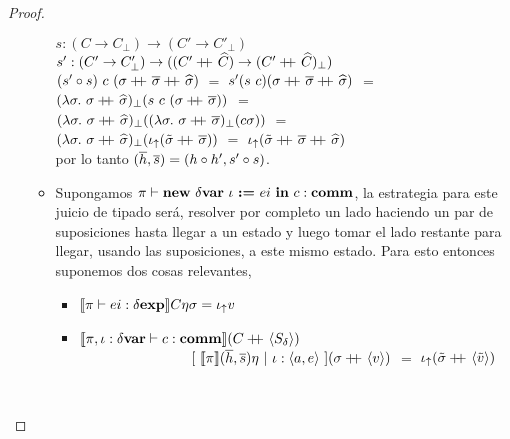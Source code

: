 \begin{proof}
\begin{itemize}
\begin{itemize}
$s : (C \rightarrow C_\bot) \rightarrow (C' \rightarrow C'_\bot)$\\
$s' : (C' \rightarrow C'_\bot) \rightarrow 
   	  ((C' +\kern-1.3ex+\kern0.8ex \widehat{C}) \rightarrow (C' +\kern-1.3ex+\kern0.8ex \widehat{C})_\bot)$\\
$(s' \circ s) \ c \ (\sigma +\kern-1.3ex+\kern0.8ex \overline{\sigma} +\kern-1.3ex+\kern0.8ex \widehat{\sigma})$ $=$
$s' (s \ c) (\sigma +\kern-1.3ex+\kern0.8ex \overline{\sigma} +\kern-1.3ex+\kern0.8ex \widehat{\sigma})$ $=$\\
$(\lambda \sigma. \ \sigma +\kern-1.3ex+\kern0.8ex \widehat{\sigma})_{\bot}
	(s \ c \ (\sigma +\kern-1.3ex+\kern0.8ex \overline{\sigma}))$ $=$\\
$(\lambda \sigma . \ \sigma +\kern-1.3ex+\kern0.8ex \widehat{\sigma})_{\bot}
((\lambda \sigma . \ \sigma +\kern-1.3ex+\kern0.8ex \overline{\sigma})_{\bot}(c \sigma))$ $=$\\
$(\lambda \sigma . \ \sigma +\kern-1.3ex+\kern0.8ex \widehat{\sigma})_{\bot}
(\iota_{\uparrow} (\tilde{\sigma} +\kern-1.3ex+\kern0.8ex \overline{\sigma}))$ $=$ 
$\iota_{\uparrow} (\tilde{\sigma} +\kern-1.3ex+\kern0.8ex \overline{\sigma} +\kern-1.3ex+\kern0.8ex \widehat{\sigma})$\\

por lo tanto $(\overline{h},\overline{s}) = (h \circ h',s'\circ s)$.\\

\item Supongamos $\pi \vdash \textbf{new} \ \delta \textbf{var} \ \iota \ \textbf{:=} \ ei \ \textbf{in} \ c : \textbf{comm}$, la estrategia para
este juicio de tipado ser\'a, resolver por completo un lado haciendo un par de suposiciones
hasta llegar a un estado y luego tomar el lado restante para llegar, usando las suposiciones,
a este mismo estado. Para esto entonces suponemos dos cosas relevantes,

\begin{itemize}
\item $\llbracket \pi \vdash ei : \delta \textbf{exp} \rrbracket C\eta\sigma = \iota_{\uparrow} v$
\item $\llbracket \pi,\iota:\delta \textbf{var} \vdash c : \textbf{comm} \rrbracket(C +\kern-1.3ex+\kern0.8ex \langle S_\delta \rangle)$\\
\indent \ \ \ \ \ \ \ \ \ \ \ \ \ \ \ \
$[ \ \semBrcks{\pi}(\hover,\sover)\eta \ | \ \iota:\lrangles{a,e} \ ]
(\sigma\concat \lrangles{v})$ $=$ $\iota_{\uparrow} (\tilde{\sigma} +\kern-1.3ex+\kern0.8ex \langle \tilde{v} \rangle)$
\end{itemize}

\


\end{itemize}
\end{itemize}
\end{proof}
